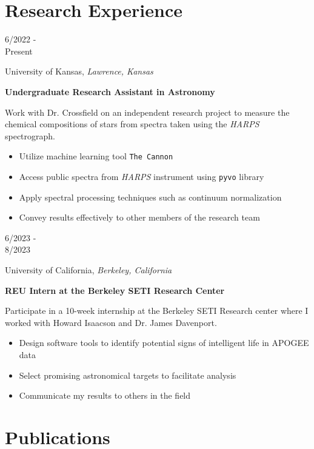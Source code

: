 \documentclass[12pt]{article}
\newenvironment{entry}[4]{
  \medskip
  \begin{minipage}[t]{0.75in}
    #3
  \end{minipage}
  \begin{minipage}[t]{\dimexpr\textwidth-0.75in}
    #1, \textit{#2}

    \textbf{#4}
    
    \smallskip
}{
  \end{minipage}
}
\begin{document}
\section*{Research Experience}\vspace{-1ex}

\begin{entry}{University of Kansas}{Lawrence, Kansas}{6/2022 -\\ Present}{Undergraduate Research Assistant in Astronomy}
  Work with Dr. Crossfield on an independent research project to measure the
  chemical compositions of stars from spectra taken using the \textit{HARPS}
  spectrograph.
  \begin{itemize}
    \item Utilize machine learning tool \texttt{The Cannon}
    \item Access public spectra from \textit{HARPS} instrument using
      \texttt{pyvo} library
    \item Apply spectral processing techniques such as continuum normalization
    \item Convey results effectively to other members of the research team
  \end{itemize}
\end{entry}

\begin{entry}{University of California}{Berkeley, California}{6/2023 -\\ 8/2023}{REU Intern at the Berkeley SETI Research Center}
  Participate in a 10-week internship at the Berkeley SETI Research center where I worked with Howard Isaacson and Dr. James Davenport.
  \begin{itemize}
    \item Design software tools to identify potential signs of intelligent
      life in APOGEE data
    \item Select promising astronomical targets to facilitate analysis
    \item Communicate my results to others in the field
  \end{itemize}
\end{entry}

\section*{Publications}\vspace{-1ex}

\newcommand{\publication}[6]{
  \medskip
  \begin{minipage}[t]{0.75in}
    #3
  \end{minipage}
  \begin{minipage}[t]{\dimexpr\textwidth-0.75in}
    \textbf{#4},#5\\
    #1, \href{#6}{\textit{#2}}
  \end{minipage}  

}
\end{document}
